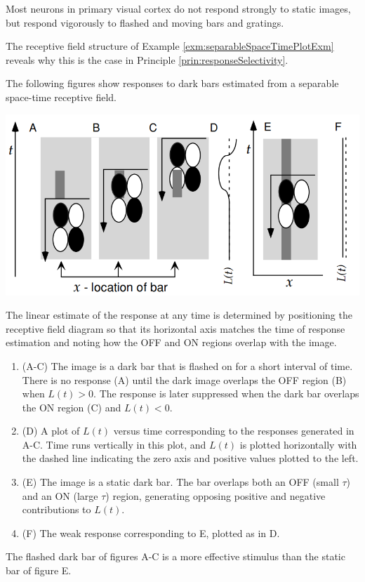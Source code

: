 \begin{prin}
  \label{prin:responseSelectivity}
  Most neurons in primary visual cortex do not respond strongly to static images, but respond vigorously to flashed and moving bars and gratings.
\end{prin}

\begin{rem}
  The receptive field structure of Example \ref{exm:separableSpaceTimePlotExm} reveals why this is the case in Principle \ref{prin:responseSelectivity}.
\end{rem}

\begin{exm}
  \label{exm:explain1}
  The following figures show responses to dark bars estimated from a separable space-time receptive field.
  \begin{center}
    \includegraphics[scale=0.27]{./png/responseSelectivityExplain1}
  \end{center}
  The linear estimate of the response at any time is determined by positioning the receptive field diagram so that its horizontal axis matches the time of response estimation and noting how the OFF and ON regions overlap with the image.
  \begin{enumerate}[]
  \item (A-C) The image is a dark bar that is flashed on for a short interval of time. There is no response (A) until the dark image overlaps the OFF region (B) when $L(t)>0$. The response is later suppressed when the dark bar overlaps the ON region (C) and $L(t) < 0$.
  \item  (D) A plot of $L(t)$ versus time corresponding to the responses generated in A-C. Time runs vertically in this plot, and $L(t)$ is plotted horizontally with the dashed line indicating the zero axis and positive values plotted to the left.
  \item (E) The image is a static dark bar. The bar overlaps both an OFF (small $\tau$) and an ON (large $\tau$) region, generating opposing positive and negative contributions to $L(t)$.
  \item (F) The weak response corresponding to E, plotted as in D.
  \end{enumerate}
  The flashed dark bar of figures A-C is a more effective stimulus than the static bar of figure E.
\end{exm}

